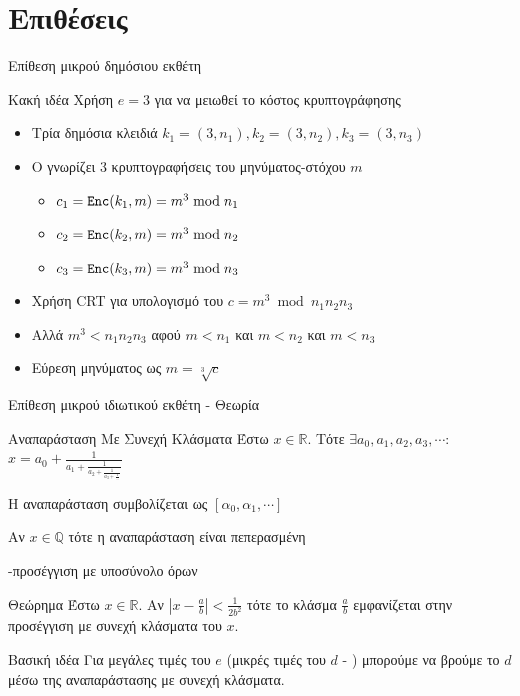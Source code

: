 \documentclass[handout]{beamer}
\begin{document}
\section{Επιθέσεις}
\begin{frame}{Επίθεση μικρού δημόσιου εκθέτη}
\begin{block}{\alert{Κακή ιδέα}}
Χρήση $e=3$ για να μειωθεί το κόστος κρυπτογράφησης
\end{block}
\pause 
\begin{itemize}
\item Τρία δημόσια κλειδιά $k_1 = (3,n_1), k_2 = (3,n_2), k_3 = (3,n_3)$
\pause
\item O \adv γνωρίζει 3 κρυπτογραφήσεις του μηνύματος-στόχου $m$
\begin{itemize}
\item $c_1 = \mathtt{Enc}(k_1,m) = m^3 \bmod{n_1}$
\item $c_2 = \mathtt{Enc}(k_2,m) = m^3 \bmod{n_2}$
\item $c_3 = \mathtt{Enc}(k_3,m) = m^3 \bmod{n_3}$
\end{itemize}
\pause
\item Χρήση CRT για υπολογισμό του $c = m^3 \bmod {n_1n_2n_3}$
\item Αλλά $m^3 < n_1n_2n_3$ αφού $m < n_1$ και $m < n_2$ και $ m<n_3$
\item Εύρεση μηνύματος ως $m = \sqrt[3]{c}$
\end{itemize}
\end{frame}

\begin{frame}{Επίθεση μικρού ιδιωτικού εκθέτη - Θεωρία}
\begin{block}{Αναπαράσταση Με Συνεχή Κλάσματα}
Έστω $x \in \mathbb{R}$. Tότε $\exists a_0,a_1,a_2,a_3, \cdots$:
$x = a_0 + \frac{1}{a_1+\frac{1}{a_2+\frac{1}{a_3+\frac{1}{\cdots}}}}$

H αναπαράσταση συμβολίζεται ως $[\alpha_0,\alpha_1, \cdots ]$

Αν $x \in \mathbb{Q}$ τότε η αναπαράσταση είναι πεπερασμένη

-προσέγγιση με υποσύνολο όρων
\end{block}
\pause
\begin{block}{Θεώρημα}
Έστω $x \in \mathbb{R}$. Αν $|x-\frac{a}{b}|<\frac{1}{2b^2}$ τότε το κλάσμα $\frac{a}{b}$ εμφανίζεται στην προσέγγιση με συνεχή κλάσματα του $x$.
\end{block}
\pause
\begin{block}{Βασική ιδέα}
Για μεγάλες τιμές του $e$ (μικρές τιμές του $d$ - ) μπορούμε να βρούμε το $d$ μέσω της αναπαράστασης με συνεχή κλάσματα.
\end{block}
\end{frame}
\end{document}
